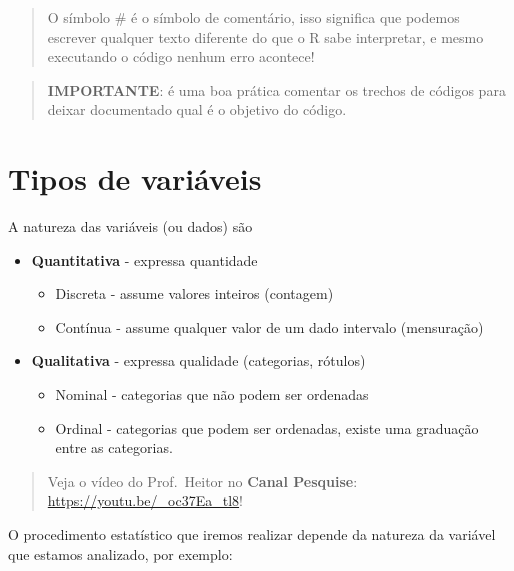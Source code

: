 \documentclass[
]{book}
\begin{document}
\begin{quote}
O símbolo \# é o símbolo de comentário, isso significa que podemos escrever qualquer texto diferente do que o R sabe interpretar, e mesmo executando o código nenhum erro acontece!
\end{quote}

\begin{quote}
\textbf{IMPORTANTE}: é uma boa prática comentar os trechos de códigos para deixar documentado qual é o objetivo do código.
\end{quote}

\chapter{Tipos de variáveis}\label{tipos-de-variuxe1veis}

A natureza das variáveis (ou dados) são

\begin{itemize}
\item
  \textbf{Quantitativa} - expressa quantidade

  \begin{itemize}
  \item
    Discreta - assume valores inteiros (contagem)
  \item
    Contínua - assume qualquer valor de um dado intervalo (mensuração)
  \end{itemize}
\item
  \textbf{Qualitativa} - expressa qualidade (categorias, rótulos)

  \begin{itemize}
  \item
    Nominal - categorias que não podem ser ordenadas
  \item
    Ordinal - categorias que podem ser ordenadas, existe uma graduação entre as categorias.
  \end{itemize}
\end{itemize}

\begin{quote}
Veja o vídeo do Prof.~Heitor no \textbf{Canal Pesquise}: \url{https://youtu.be/_oc37Ea_tl8}!
\end{quote}

O procedimento estatístico que iremos realizar depende da natureza da variável que estamos analizado, por exemplo:
\end{document}
